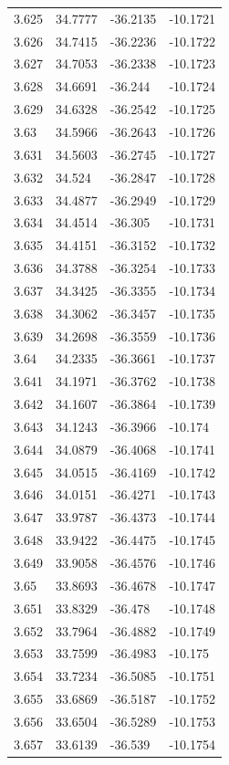\begin{tabular}{llll}
3.625 & 34.7777 & -36.2135 & -10.1721 \\
3.626 & 34.7415 & -36.2236 & -10.1722 \\
3.627 & 34.7053 & -36.2338 & -10.1723 \\
3.628 & 34.6691 & -36.244 & -10.1724 \\
3.629 & 34.6328 & -36.2542 & -10.1725 \\
3.63 & 34.5966 & -36.2643 & -10.1726 \\
3.631 & 34.5603 & -36.2745 & -10.1727 \\
3.632 & 34.524 & -36.2847 & -10.1728 \\
3.633 & 34.4877 & -36.2949 & -10.1729 \\
3.634 & 34.4514 & -36.305 & -10.1731 \\
3.635 & 34.4151 & -36.3152 & -10.1732 \\
3.636 & 34.3788 & -36.3254 & -10.1733 \\
3.637 & 34.3425 & -36.3355 & -10.1734 \\
3.638 & 34.3062 & -36.3457 & -10.1735 \\
3.639 & 34.2698 & -36.3559 & -10.1736 \\
3.64 & 34.2335 & -36.3661 & -10.1737 \\
3.641 & 34.1971 & -36.3762 & -10.1738 \\
3.642 & 34.1607 & -36.3864 & -10.1739 \\
3.643 & 34.1243 & -36.3966 & -10.174 \\
3.644 & 34.0879 & -36.4068 & -10.1741 \\
3.645 & 34.0515 & -36.4169 & -10.1742 \\
3.646 & 34.0151 & -36.4271 & -10.1743 \\
3.647 & 33.9787 & -36.4373 & -10.1744 \\
3.648 & 33.9422 & -36.4475 & -10.1745 \\
3.649 & 33.9058 & -36.4576 & -10.1746 \\
3.65 & 33.8693 & -36.4678 & -10.1747 \\
3.651 & 33.8329 & -36.478 & -10.1748 \\
3.652 & 33.7964 & -36.4882 & -10.1749 \\
3.653 & 33.7599 & -36.4983 & -10.175 \\
3.654 & 33.7234 & -36.5085 & -10.1751 \\
3.655 & 33.6869 & -36.5187 & -10.1752 \\
3.656 & 33.6504 & -36.5289 & -10.1753 \\
3.657 & 33.6139 & -36.539 & -10.1754 \\

\end{tabular}
